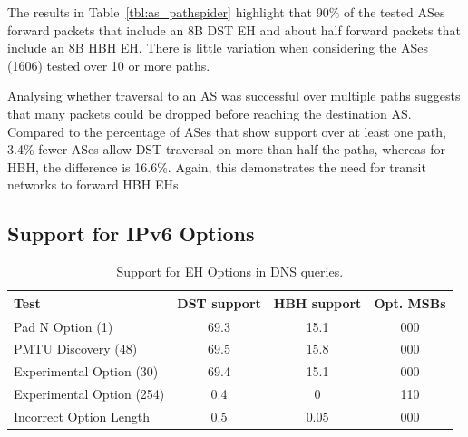 \documentclass[conference]{IEEEtran}
\begin{document}




The results in Table~\ref{tbl:as_pathspider} highlight that 90\% of the tested ASes forward packets that include an  8B DST EH
 and about half forward packets that include an
8B HBH EH.  There is little variation when considering the ASes (1606) tested over 10 or more paths.  

Analysing whether traversal to an AS was successful over multiple paths suggests that many packets could be
dropped before reaching the destination AS. Compared to the percentage of ASes that show support over at least one path, 3.4\% fewer ASes allow DST traversal on more than half the paths, whereas for HBH, the
difference is 16.6\%. Again, this demonstrates the need for  transit 
networks to forward HBH EHs. 

\subsection{Support for IPv6 Options}

\begin{table}[t]
\centering 
\caption{Support for EH Options in DNS queries.}
\begin{tabular}{l|c|c|c}
Test                      & DST support & HBH support & Opt. MSBs\\
\hline \hline
Pad N Option (1)          & 69.3        & 15.1   & 000    \\
PMTU Discovery (48)       & 69.5        & 15.8    & 000   \\
Experimental Option (30)  & 69.4        & 15.1   & 000    \\
Experimental Option (254) & 0.4         & 0      & 110    \\
Incorrect Option Length   & 0.5         & 0.05    &   000     
\end{tabular}
\label{tbl:option_type_support}
\end{table}
\end{document}
